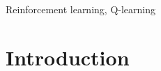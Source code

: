 \documentclass[conference]{IEEEtran}
\begin{document}
\begin{IEEEkeywords}
Reinforcement learning, Q-learning
\end{IEEEkeywords}


%
\IEEEpeerreviewmaketitle


\section{Introduction}



%
%



%
\end{document}
